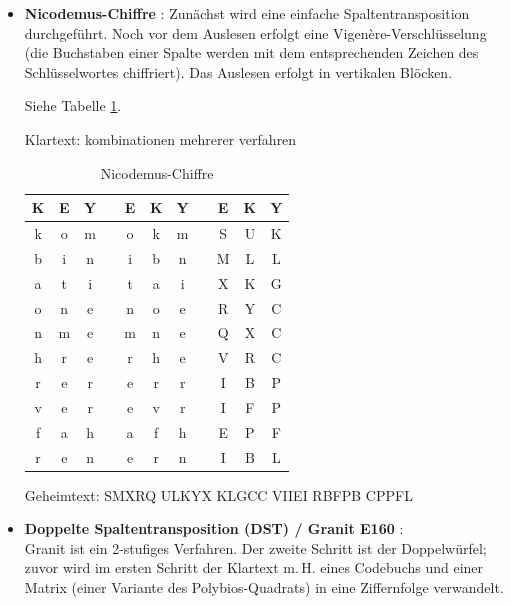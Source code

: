 \begin{refsegment}
\begin{itemize}
\begin{table}[ht]
   \end{table}

\item {\bf Nicodemus-Chiffre} \cite{ACA2002}:
   Zunächst wird eine einfache Spaltentransposition durchgeführt. Noch vor
   dem Auslesen erfolgt eine Vigen\`ere-Verschlüsselung (die Buchstaben einer
   Spalte werden mit dem entsprechenden Zeichen des Schlüsselwortes
   chiffriert).
   Das Auslesen erfolgt in vertikalen Blöcken.

   Siehe Tabelle \ref{Nicodemus-table-reference}.

   Klartext: kombinationen mehrerer verfahren

   \begin{table}[ht]
   \begin{center}
   \begin{tabular}{|ccccccccccc|}
   \hline
	K & E & Y & & E & K & Y & & E & K & Y\\
   \hline
	k & o & m & & o & k & m & & S & U & K\\
	b & i & n & & i & b & n & & M & L & L\\
	a & t & i & & t & a & i & & X & K & G\\
	o & n & e & & n & o & e & & R & Y & C\\
	n & m & e & & m & n & e & & Q & X & C\\
	h & r & e & & r & h & e & & V & R & C\\
	r & e & r & & e & r & r & & I & B & P\\
	v & e & r & & e & v & r & & I & F & P\\
	f & a & h & & a & f & h & & E & P & F\\
	r & e & n & & e & r & n & & I & B & L\\
   \hline
   \end{tabular}
   \caption{Nicodemus-Chiffre}
   \label{Nicodemus-table-reference}
   \end{center}
   \end{table}

   Geheimtext: SMXRQ ULKYX KLGCC VIIEI RBFPB CPPFL\\



\item {\bf Doppelte Spaltentransposition (DST) / \glqq Granit E160\grqq}
   \cite{Drobick2015}:\\%
     Granit ist ein 2-stufiges Verfahren. Der zweite Schritt ist der Doppelwürfel;
     zuvor wird im ersten Schritt der Klartext m.\,H. eines Codebuchs und einer
     Matrix (einer Variante des Polybios-Quadrats) in eine Ziffernfolge verwandelt.


\end{itemize}
\end{refsegment}
